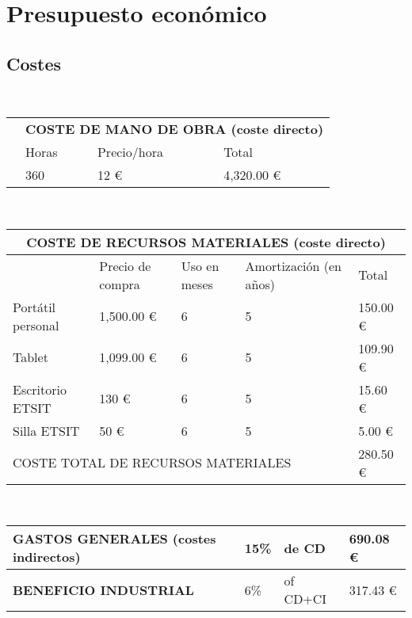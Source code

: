 \chapter{Presupuesto económico} \label{chap:economic}

\section{Costes}

\ \hfill
\begin{tabular}{ p{5.5cm}|p{2.7cm}|p{2.7cm}|p{2cm}|  }
	\cline{2-4}
	& \multicolumn{3}{|c|}{\textbf{COSTE DE MANO DE OBRA (coste directo)}} \\
	\cline{2-4}
	& Horas & Precio/hora & Total \\
	\cline{2-4}
	& 360 & \hfill 12 \euro & \hfill 4,320.00 \euro \\
	\cline{2-4}
\end{tabular}

\vspace{1cm}

\ \hfill
\begin{tabular}{ |p{3cm}| *{4}{p{2.1cm}|}  }
	\hline
	\multicolumn{5}{|c|}{\textbf{COSTE DE RECURSOS MATERIALES (coste directo)}} \\
	\hline
	& Precio de compra & Uso en meses & Amortización (en años) & Total \\
	\hline
	Portátil personal & \hfill 1,500.00 \euro & 6 & 5 & \hfill 150.00 \euro \\
	\hline
	Tablet & \hfill 1,099.00 \euro & 6 & 5 & \hfill 109.90 \euro \\
	\hline
	Escritorio ETSIT & \hfill 130 \euro & 6 & 5 & \hfill 15.60 \euro \\
	\hline
	Silla ETSIT & \hfill 50 \euro & 6 & 5 & \hfill 5.00 \euro \\
	\hline
	\multicolumn{4}{|l|}{COSTE TOTAL DE RECURSOS MATERIALES} & \hfill 280.50 \euro \\
	\hline
\end{tabular}

\vspace{1cm}

\ \hfill
\begin{tabular}{ |p{8.4cm}|p{0.8cm}|p{2.1cm}|p{2cm}| }
	\hline
	\textbf{GASTOS GENERALES (costes indirectos)} & 15\% & de CD & \hfill 690.08 \euro \\
	\hline
	\textbf{BENEFICIO INDUSTRIAL} & 6\% & of CD+CI & \hfill 317.43 \euro \\
	\hline
\end{tabular}

